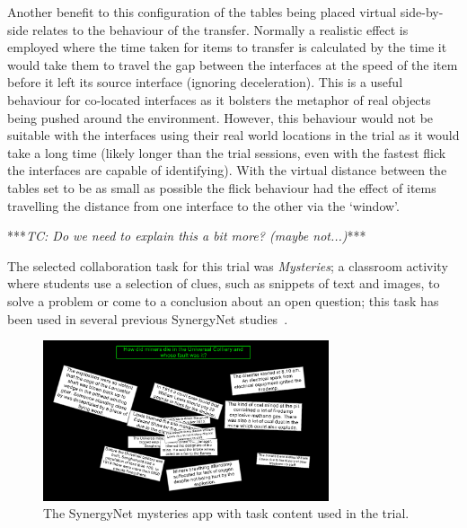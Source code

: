 \documentclass[a4paper,11pt]{article}
\begin{document}
Another benefit to this configuration of the tables being placed virtual side-by-side relates to the behaviour of the transfer.
Normally a realistic effect is employed where the time taken for items to transfer is calculated by the time it would take them to travel the gap between the interfaces at the speed of the item before it left its source interface (ignoring deceleration).
This is a useful behaviour for co-located interfaces as it bolsters the metaphor of real objects being pushed around the environment.
However, this behaviour would not be suitable with the interfaces using their real world locations in the trial as it would take a long time (likely longer than the trial sessions, even with the fastest flick the interfaces are capable of identifying).
With the virtual distance between the tables set to be as small as possible the flick behaviour had the effect of items travelling the distance from one interface to the other via the `window'.


***{\emph{TC: Do we need to explain this a bit more? (maybe not...)}}***

The selected collaboration task for this trial was {\emph{Mysteries}}; a classroom activity where students use a selection of clues, such as snippets of text and images, to solve a problem or come to a conclusion about an open question; this task has been used in several previous SynergyNet studies~\cite{mercier:2013,mercier:2014,mercier:2015}.

\begin{figure}[h]
 \centering
   \includegraphics[width=0.75\textwidth]{figures/flickmysteryexample.png}
   \caption{The SynergyNet mysteries app with task content used in the trial.}
   \label{fig:FlickMysteryExample}
\end{figure}
\end{document}
